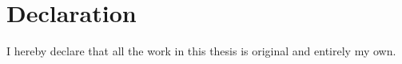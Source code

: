\chapter*{Declaration}

I hereby declare that all the work in this thesis is original and entirely my own.
